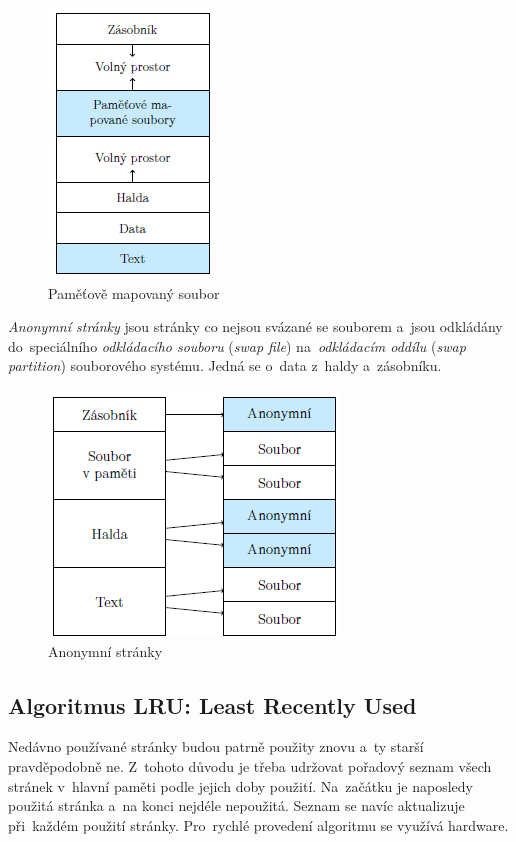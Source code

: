 \begin{figure}[ht]
	\centering
	\includegraphics[scale=1]{images/mem_page_file.png}
	\caption{Paměťově mapovaný soubor}
	\label{mem_page_file}
\end{figure}

\emph{Anonymní stránky} jsou stránky co nejsou svázané se souborem a~jsou odkládány do~speciálního \emph{odkládacího souboru} (\emph{swap file}) na~\emph{odkládacím oddílu} (\emph{swap partition}) souborového systému. Jedná se o~data z~haldy a~zásobníku.

\begin{figure}[ht]
	\centering
	\includegraphics[scale=1]{images/mem_page_anon.png}
	\caption{Anonymní stránky}
	\label{mem_page}
\end{figure}

\subsection{Algoritmus LRU: Least Recently Used}

Nedávno používané stránky budou patrně použity znovu a~ty starší pravděpodobně ne. Z~tohoto důvodu je třeba udržovat pořadový seznam všech stránek v~hlavní paměti podle jejich doby použití. Na~začátku je naposledy použitá stránka a~na konci nejdéle nepoužitá. Seznam se navíc aktualizuje při~každém použití stránky. Pro~rychlé provedení algoritmu se využívá hardware.

